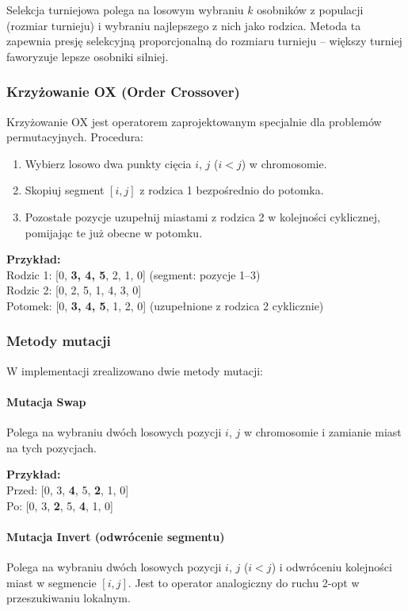\documentclass[a4paper,12pt]{article}
\begin{document}
Selekcja turniejowa polega na losowym wybraniu $k$ osobników z populacji (rozmiar turnieju) i wybraniu
najlepszego z nich jako rodzica. Metoda ta zapewnia presję selekcyjną proporcjonalną do rozmiaru turnieju --
większy turniej faworyzuje lepsze osobniki silniej.

\subsubsection{Krzyżowanie OX (Order Crossover)}

Krzyżowanie OX jest operatorem zaprojektowanym specjalnie dla problemów permutacyjnych.
Procedura:
\begin{enumerate}
    \item Wybierz losowo dwa punkty cięcia $i$, $j$ ($i < j$) w chromosomie.
    \item Skopiuj segment $[i, j]$ z rodzica 1 bezpośrednio do potomka.
    \item Pozostałe pozycje uzupełnij miastami z rodzica 2 w kolejności cyklicznej, pomijając te już obecne w potomku.
\end{enumerate}

\textbf{Przykład:}\\
Rodzic 1: [0, \textbf{3, 4, 5}, 2, 1, 0] \quad (segment: pozycje 1--3)\\
Rodzic 2: [0, 2, 5, 1, 4, 3, 0]\\
Potomek:  [0, \textbf{3, 4, 5}, 1, 2, 0] \quad (uzupełnione z rodzica 2 cyklicznie)

\subsubsection{Metody mutacji}

W implementacji zrealizowano dwie metody mutacji:

\paragraph{Mutacja Swap}
Polega na wybraniu dwóch losowych pozycji $i$, $j$ w chromosomie i zamianie miast na tych pozycjach.

\textbf{Przykład:}\\
Przed: [0, 3, \textbf{4}, 5, \textbf{2}, 1, 0]\\
Po:    [0, 3, \textbf{2}, 5, \textbf{4}, 1, 0]

\paragraph{Mutacja Invert (odwrócenie segmentu)}
Polega na wybraniu dwóch losowych pozycji $i$, $j$ ($i < j$) i odwróceniu kolejności miast w segmencie $[i, j]$.
Jest to operator analogiczny do ruchu 2-opt w przeszukiwaniu lokalnym.
\end{document}
